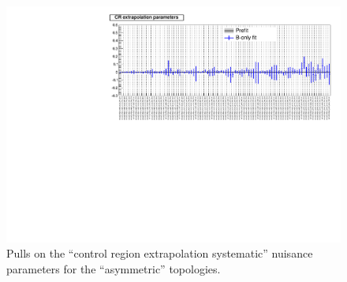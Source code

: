 \newpage
\begin{landscape}
\begin{figure}[h!]
\caption{Pulls on the ``control region extrapolation systematic'' nuisance parameters for the ``asymmetric'' topologies.\label{fig:nuisPull_extrap_asym}}
    \includegraphics[width=\linewidth]{figures/postFitResults/extrap_asym_ALL_nuisances.pdf}
\end{figure}
\end{landscape}
